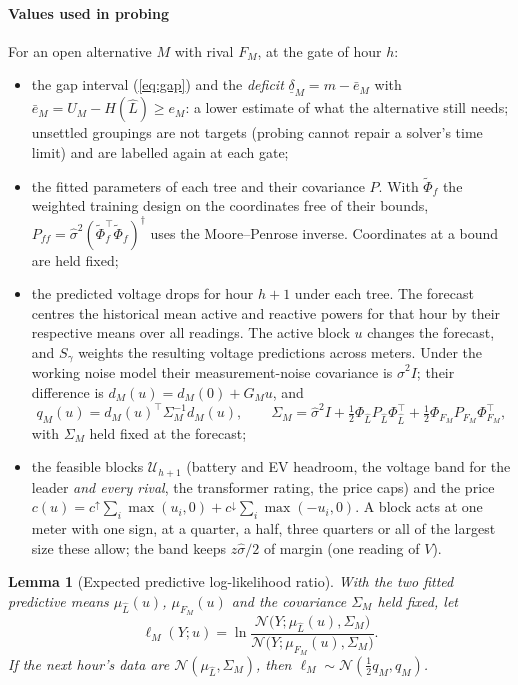 \documentclass[journal,onecolumn,11pt]{IEEEtran}
\newtheorem{lemma}{Lemma}
\newcommand{\tp}{^{\top}}
\newcommand{\Uset}{\mathcal{U}}
\begin{document}
\paragraph*{Values used in probing} For an open alternative $M$ with rival $F_M$, at the gate of hour $h$:
\begin{itemize}
\item the gap interval (\ref{eq:gap}) and the \emph{deficit} $\underline\delta_M=m-\bar e_M$ with $\bar e_M=U_M-H(\hat L)\ge
e_M$: a lower estimate of what the alternative still needs; unsettled groupings are not targets (probing cannot repair a
solver's time limit) and are labelled again at each gate;
\item the fitted parameters of each tree and their covariance $P$. With $\tilde\Phi_f$ the weighted training design
on the coordinates free of their bounds, $P_{ff}=\hat\sigma^2(\tilde\Phi_f\tp\tilde\Phi_f)^\dagger$ uses the
Moore--Penrose inverse. Coordinates at a bound are held fixed;
\item the predicted voltage drops for hour $h+1$ under each tree. The forecast centres the historical mean active
and reactive powers for that hour by their respective means over all readings. The active block $u$ changes the
forecast, and $S_\gamma$ weights the resulting voltage predictions across meters. Under the working noise model
their measurement-noise covariance is $\hat\sigma^2 I$;
their difference is $d_M(u)=d_M(0)+G_Mu$, and
\begin{equation}\label{eq:sep}
q_M(u)=d_M(u)\tp\Sigma_M^{-1}d_M(u),\qquad \Sigma_M=\hat\sigma^2I+\tfrac12\Phi_{\hat L}P_{\hat L}\Phi_{\hat L}\tp+\tfrac12\Phi_{F_M}P_{F_M}\Phi_{F_M}\tp,
\end{equation}
with $\Sigma_M$ held fixed at the forecast;
\item the feasible blocks $\Uset_{h+1}$ (battery and EV headroom, the voltage band for the leader \emph{and every rival}, the
transformer rating, the price caps) and the price $c(u)=c^\uparrow\sum_i\max(u_i,0)+c^\downarrow\sum_i\max(-u_i,0)$. A block
acts at one meter with one sign, at a quarter, a half, three quarters or all of the largest size these allow; the band keeps
$z\hat\sigma/2$ of margin (one reading of $V$).
\end{itemize}
\begin{lemma}[Expected predictive log-likelihood ratio]\label{lem:evidence}
With the two fitted predictive means $\mu_{\hat L}(u)$, $\mu_{F_M}(u)$ and the covariance $\Sigma_M$ held fixed, let
\begin{equation}\label{eq:llr}
\ell_M(Y;u)=\ln\frac{\mathcal N\big(Y;\mu_{\hat L}(u),\Sigma_M\big)}{\mathcal N\big(Y;\mu_{F_M}(u),\Sigma_M\big)} .
\end{equation}
If the next hour's data are $\mathcal N(\mu_{\hat L},\Sigma_M)$, then $\ell_M\sim\mathcal N(\tfrac12q_M,q_M)$.
\end{lemma}
\end{document}
